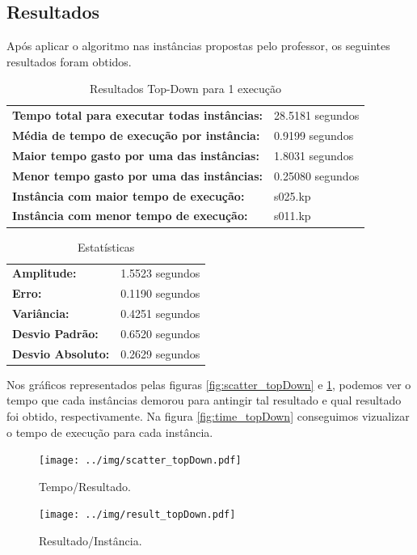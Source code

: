 \documentclass[a4paper, 12pt]{article}
\begin{document}
\subsection{Resultados}

Após aplicar o algoritmo  nas instâncias propostas pelo professor, os seguintes resultados
foram obtidos.
\begin{table}[!htb]
    \begin{tabular}{ll}
    \textbf{Tempo total para executar todas instâncias:} & 28.5181 segundos \\
    \textbf{Média de tempo de execução por instância:} & 0.9199 segundos \\
    \textbf{Maior tempo gasto por uma das instâncias:} & 1.8031 segundos \\
    \textbf{Menor tempo gasto por uma das instâncias:} & 0.25080 segundos \\
    \textbf{Instância com maior tempo de execução:} & s025.kp \\
    \textbf{Instância com menor tempo de execução:} & s011.kp
    \end{tabular}
    \caption{Resultados Top-Down para 1 execução}
    \label{tab:topdown_exec}
\end{table}
\begin{table}[!htb]
    \begin{tabular}{ll}
    \textbf{Amplitude:} & 1.5523 segundos \\
    \textbf{Erro:} & 0.1190 segundos \\
    \textbf{Variância:} & 0.4251 segundos \\
    \textbf{Desvio Padrão:} & 0.6520 segundos \\
    \textbf{Desvio Absoluto:} & 0.2629 segundos
    \end{tabular}
    \caption{Estatísticas}
    \label{tab:estatistica_topdown}
\end{table}

\newpage
Nos gráficos representados pelas figuras \ref{fig:scatter_topDown} e \ref{fig:result_topDown}, podemos ver o tempo
que cada instâncias demorou para antingir tal resultado e qual resultado foi obtido, respectivamente. 
Na figura \ref{fig:time_topDown} conseguimos vizualizar o tempo de execução para cada instância.
\begin{figure}[!htb]
    \centering
    \begin{minipage}{0.55\textwidth}
        \centering
        \texttt{[image: ../img/scatter\_topDown.pdf]}
        \caption{Tempo/Resultado.}
        \label{fig:scatter_topDown}
    \end{minipage}%
    \begin{minipage}{0.55\textwidth}
        \centering
        \texttt{[image: ../img/result\_topDown.pdf]}
        \caption{Resultado/Instância.}
        \label{fig:result_topDown}
    \end{minipage}
\end{figure}
\end{document}
